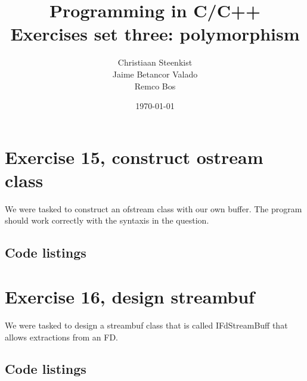 \documentclass[11pt]{article}
\begin{document}
\title{Programming in C/C++ \\
       Exercises set three: polymorphism
}
\date{\today}
\author{Christiaan Steenkist \\
Jaime Betancor Valado \\
Remco Bos \\
}

\maketitle
\section*{Exercise 15, construct ostream class}
We were tasked to construct an ofstream class with our own buffer. The program should work correctly with the syntaxis in the question.

\subsection*{Code listings}









\section*{Exercise 16, design streambuf}
We were tasked to design a streambuf class that is called IFdStreamBuff that allows extractions from an FD.

\subsection*{Code listings}











\end{document}
